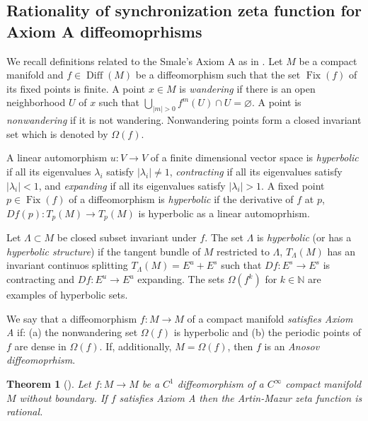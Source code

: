 \documentclass[oneside]{amsart}
\def\N{\mathbb{N}}
\def\Diff{\operatorname{Diff}}
\def\Fix{\operatorname{Fix}}
\newtheorem{thm}{Theorem}
\begin{document}
\subsection{Rationality of synchronization zeta function for Axiom A diffeomoprhisms} \label{sec:axiom-A}


We recall definitions related to the Smale's Axiom A as in \cite{Sma67}.
Let $M$ be a compact manifold and $f \in \Diff(M)$ be a diffeomorphism
such that the set $\Fix(f)$ of its fixed points is finite.
A point $x \in M$ is \emph{wandering} if there is an open neighborhood $U$ of $x$
such that $\bigcup_{|m|>0} f^m(U) \cap U = \varnothing$.
A point is \emph{nonwandering} if it is not wandering.
Nonwandering points form a closed invariant set which is denoted by $\Omega(f)$.

A linear automorphism $u: V \to V$ of a finite dimensional vector space is \emph{hyperbolic}
if all its eigenvalues $\lambda_i$ satisfy $|\lambda_i| \neq 1$,
\emph{contracting} if all its eigenvalues satisfy $|\lambda_i| < 1$,
and \emph{expanding} if all its eigenvalues satisfy $|\lambda_i| > 1$.
A fixed point $p \in \Fix(f)$ of a diffeomorphism is \emph{hyperbolic}
if the derivative of $f$ at $p$, $Df(p): T_p(M) \to T_p(M)$ is hyperbolic
as a linear automoprhism.

Let $\Lambda \subset M$ be closed subset invariant under $f$.
The set $\Lambda$ is \emph{hyperbolic} (or has a \emph{hyperbolic structure})
if the tangent bundle of $M$ restricted to $\Lambda$, $T_\Lambda(M)$ has an invariant continuos
splitting $T_\Lambda(M) = E^u + E^s$ such that $Df: E^s \to E^s$ is contracting
and $Df: E^u \to E^u$ expanding.
The sets $\Omega(f^k)$ for $k \in \N$ are examples of hyperbolic sets.

We say that a diffeomorphism $f: M \to M$ of a compact manifold \emph{satisfies Axiom A}
if: (a) the nonwandering set $\Omega(f)$ is hyperbolic and
(b) the periodic points of $f$ are dense in $\Omega(f)$.
If, additionally, $M = \Omega(f)$, then $f$ is an \emph{Anosov diffeomoprhism}.

\begin{thm}[{\protect \cite{Man71}}] \label{thm:Manning}
  Let $f: M \to M$ be a $C^1$ diffeomorphism of a $C^\infty$ compact manifold $M$ without boundary.
  If $f$ satisfies Axiom A then the Artin-Mazur zeta function
  is rational.
\end{thm}
\end{document}

